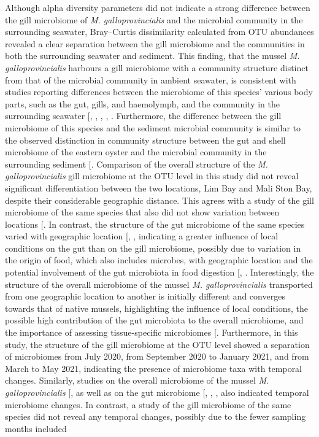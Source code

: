 \documentclass[
  12 pt,
]{article}
\begin{document}
Although alpha diversity parameters did not indicate a strong difference between the gill microbiome of \emph{M. galloprovincialis} and the microbial community in the surrounding seawater, Bray--Curtis dissimilarity calculated from OTU abundances revealed a clear separation between the gill microbiome and the communities in both the surrounding seawater and sediment. This finding, that the mussel \emph{M. galloprovincialis} harbours a gill microbiome with a community structure distinct from that of the microbial community in ambient seawater, is consistent with studies reporting differences between the microbiome of this species' various body parts, such as the gut, gills, and haemolymph, and the community in the surrounding seawater {[}, , , , \citeproc{ref-Zardinoni2024}{31}{]}. Furthermore, the difference between the gill microbiome of this species and the sediment microbial community is similar to the observed distinction in community structure between the gut and shell microbiome of the eastern oyster and the microbial community in the surrounding sediment {[}\citeproc{ref-Arfken2017}{11}{]}. Comparison of the overall structure of the \emph{M. galloprovincialis} gill microbiome at the OTU level in this study did not reveal significant differentiation between the two locations, Lim Bay and Mali Ston Bay, despite their considerable geographic distance. This agrees with a study of the gill microbiome of the same species that also did not show variation between locations {[}\citeproc{ref-Zardinoni2024}{31}{]}. In contrast, the structure of the gut microbiome of the same species varied with geographic location {[}, \citeproc{ref-Palladino2023}{28}{]}, indicating a greater influence of local conditions on the gut than on the gill microbiome, possibly due to variation in the origin of food, which also includes microbes, with geographic location and the potential involvement of the gut microbiota in food digestion {[}, \citeproc{ref-Gosling2003c}{89}{]}. Interestingly, the structure of the overall microbiome of the mussel \emph{M. galloprovincialis} transported from one geographic location to another is initially different and converges towards that of native mussels, highlighting the influence of local conditions, the possible high contribution of the gut microbiota to the overall microbiome, and the importance of assessing tissue-specific microbiomes {[}\citeproc{ref-Peruzzo2026}{23}{]}. Furthermore, in this study, the structure of the gill microbiome at the OTU level showed a separation of microbiomes from July 2020, from September 2020 to January 2021, and from March to May 2021, indicating the presence of microbiome taxa with temporal changes. Similarly, studies on the overall microbiome of the mussel \emph{M. galloprovincialis} {[}\citeproc{ref-Peruzzo2026}{23}{]}, as well as on the gut microbiome {[}, , \citeproc{ref-Wathsala2021}{30}{]}, also indicated temporal microbiome changes. In contrast, a study of the gill microbiome of the same species did not reveal any temporal changes, possibly due to the fewer sampling months included 
\end{document}
